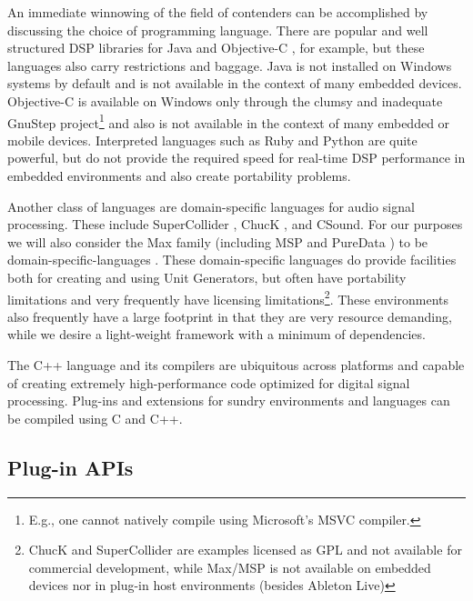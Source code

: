 \documentclass[twoside,10pt]{article}
\begin{document}
An immediate winnowing of the field of contenders can be accomplished by discussing the choice of programming language.  There are popular and well structured DSP libraries for Java \cite{Guillemard:2005, Burk:1998} and Objective-C \cite{Jaffe:1989,Jaffe:1991}, for example, but these languages also carry restrictions and baggage.  Java is not installed on Windows systems by default and is not available in the context of many embedded devices.  Objective-C is available on Windows only through the clumsy and inadequate GnuStep project\footnote{E.g., one cannot natively compile using Microsoft's MSVC compiler.} \cite{web3} and also is not available in the context of many embedded or mobile devices.  Interpreted languages such as Ruby and Python are quite powerful, but do not provide the required speed for real-time DSP performance in embedded environments and also create portability problems. 


Another class of languages are domain-specific languages for audio signal processing.  These include SuperCollider \cite{McCartney:1996}, ChucK \cite{wang:2008}, and CSound.  For our purposes we will also consider the Max family (including MSP \cite{Zicarelli:1998} and PureData \cite{Puckette:1996}) to be domain-specific-languages
.  
These domain-specific languages do provide facilities both for creating and using Unit Generators, but often have portability limitations and very frequently have licensing limitations\footnote{ChucK and SuperCollider are examples licensed as GPL and not available for commercial development, while Max/MSP is not available on embedded devices nor in plug-in host environments (besides Ableton Live)}.  These environments also frequently have a large footprint in that they are very resource demanding, while we desire a light-weight framework with a minimum of dependencies.

The C++ language and its compilers are ubiquitous across platforms and capable of creating extremely high-performance code optimized for digital signal processing. Plug-ins and extensions for sundry environments and languages can be compiled using C and C++. 



\subsection{Plug-in APIs} %
\end{document}
